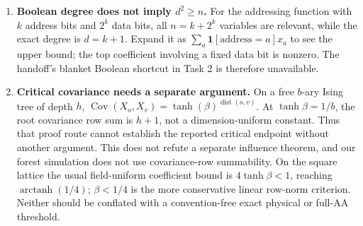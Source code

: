 \begin{enumerate}
\item \textbf{Boolean degree does not imply $d^2\ge n$.}
For the addressing function with $k$ address bits and $2^k$ data bits,
all $n=k+2^k$ variables are relevant, while the exact degree is $d=k+1$.
Expand it as $\sum_a\mathbf1[\text{address}=a]x_a$ to see the upper
bound; the top coefficient involving a fixed data bit is nonzero.
The handoff's blanket Boolean shortcut in Task 2 is therefore unavailable.

\item \textbf{Critical covariance needs a separate argument.}
On a free $b$-ary Ising tree of depth $h$,
$\operatorname{Cov}(X_o,X_v)=\tanh(\beta)^{\operatorname{dist}(o,v)}$.
At $\tanh\beta=1/b$, the root covariance row sum is $h+1$, not a
dimension-uniform constant. Thus that proof route cannot establish the
reported critical endpoint without another argument. This does not
refute a separate influence theorem, and our forest simulation does
not use covariance-row summability. On the square lattice the usual
field-uniform coefficient bound is $4\tanh\beta<1$, reaching
$\operatorname{arctanh}(1/4)$; $\beta<1/4$ is the more conservative
linear row-norm criterion. Neither should be conflated with a
convention-free exact physical or full-AA threshold.
\end{enumerate}
